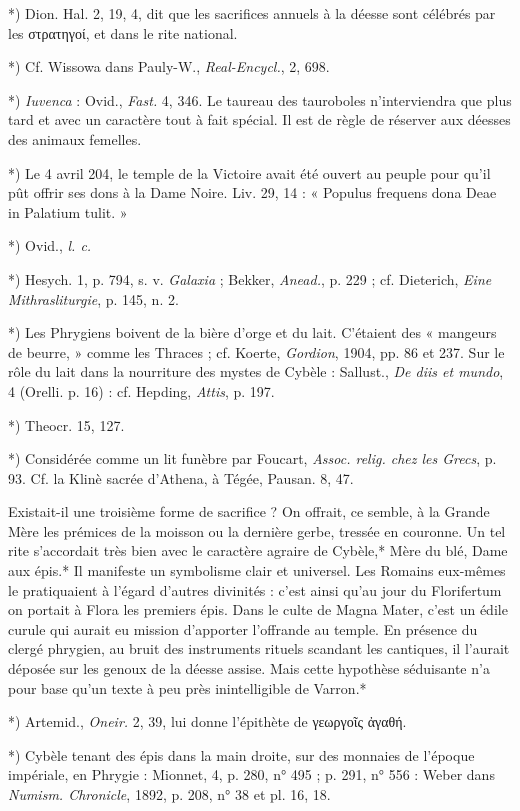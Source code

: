 \documentclass[a4paper, 11pt, oneside, polutonikogreek, french]{article}
\begin{document}
*) Dion. Hal. 2, 19, 4, dit que les sacrifices annuels à la déesse sont célébrés par les στρατηγοί, et dans le rite national.

*) Cf. Wissowa dans Pauly-W., \emph{Real-Encycl.}, 2, 698.

*) \emph{Iuvenca} : Ovid., \emph{Fast.} 4, 346. Le taureau des tauroboles n'interviendra que plus tard et avec un caractère tout à fait spécial. Il est de règle de réserver aux déesses des animaux femelles.

*) Le 4 avril 204, le temple de la Victoire avait été ouvert au peuple pour qu'il pût offrir ses dons à la Dame Noire. Liv.  29, 14 : « Populus frequens dona Deae in Palatium tulit. »

*) Ovid., \emph{l. c.}

*) Hesych. 1, p. 794, s. v. \emph{Galaxia} ; Bekker, \emph{Anead.}, p. 229 ; cf. Dieterich, \emph{Eine Mithrasliturgie}, p. 145, n. 2.

*) Les Phrygiens boivent de la bière d'orge et du lait. C'étaient des « mangeurs de beurre, » comme les Thraces ; cf. Koerte, \emph{Gordion}, 1904, pp. 86 et 237. Sur le rôle du lait dans la nourriture des mystes de Cybèle : Sallust., \emph{De diis et mundo}, 4 (Orelli. p. 16) : cf. Hepding, \emph{Attis}, p. 197.

*) Theocr. 15, 127.

*) Considérée comme un lit funèbre par Foucart, \emph{Assoc. relig. chez les Grecs}, p. 93. Cf. la Klinè sacrée d'Athena, à Tégée, Pausan. 8, 47.

Existait-il une troisième forme de sacrifice ? On offrait, ce semble, à la Grande Mère les prémices de la moisson ou la dernière gerbe, tressée en couronne. Un tel rite s'accordait très bien avec le caractère agraire de Cybèle,* Mère du blé, Dame aux épis.* Il manifeste un symbolisme clair et universel. Les Romains eux-mêmes le pratiquaient à l'égard d'autres divinités : c'est ainsi qu'au jour du Florifertum on portait à Flora les premiers épis. Dans le culte de Magna Mater, c'est un édile curule qui aurait eu mission d'apporter l'offrande au temple. En présence du clergé phrygien, au bruit des instruments rituels scandant les cantiques, il l'aurait déposée sur les genoux de la déesse assise. Mais cette hypothèse séduisante n'a pour base qu'un texte à peu près inintelligible de Varron.*

*) Artemid., \emph{Oneir.} 2, 39, lui donne l'épithète de γεωργοῖς ἀγαθή.

*) Cybèle tenant des épis dans la main droite, sur des monnaies de l'époque impériale, en Phrygie : Mionnet, 4, p. 280, n° 495 ; p. 291, n° 556 : Weber dans \emph{Numism. Chronicle}, 1892, p. 208, n° 38 et pl. 16, 18.
\end{document}
